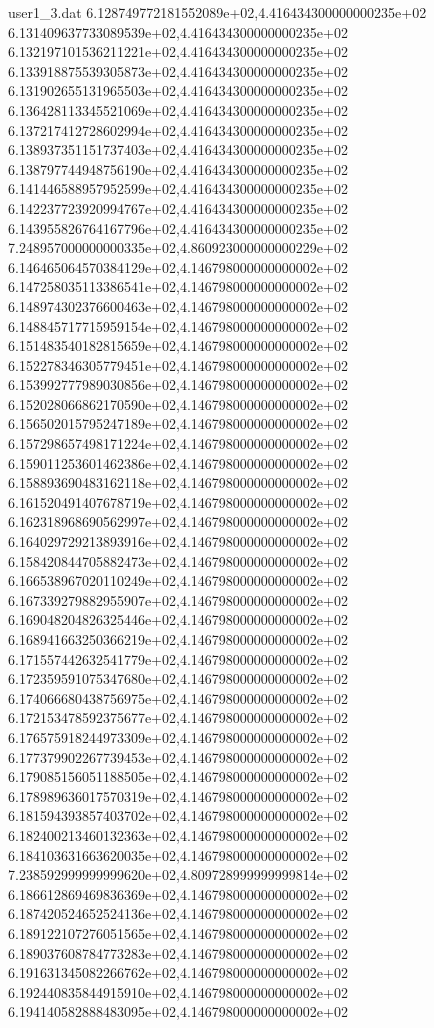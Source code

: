 \begin{filecontents}{user1_3.dat}
6.128749772181552089e+02,4.416434300000000235e+02
6.131409637733089539e+02,4.416434300000000235e+02
6.132197101536211221e+02,4.416434300000000235e+02
6.133918875539305873e+02,4.416434300000000235e+02
6.131902655131965503e+02,4.416434300000000235e+02
6.136428113345521069e+02,4.416434300000000235e+02
6.137217412728602994e+02,4.416434300000000235e+02
6.138937351151737403e+02,4.416434300000000235e+02
6.138797744948756190e+02,4.416434300000000235e+02
6.141446588957952599e+02,4.416434300000000235e+02
6.142237723920994767e+02,4.416434300000000235e+02
6.143955826764167796e+02,4.416434300000000235e+02
7.248957000000000335e+02,4.860923000000000229e+02
6.146465064570384129e+02,4.146798000000000002e+02
6.147258035113386541e+02,4.146798000000000002e+02
6.148974302376600463e+02,4.146798000000000002e+02
6.148845717715959154e+02,4.146798000000000002e+02
6.151483540182815659e+02,4.146798000000000002e+02
6.152278346305779451e+02,4.146798000000000002e+02
6.153992777989030856e+02,4.146798000000000002e+02
6.152028066862170590e+02,4.146798000000000002e+02
6.156502015795247189e+02,4.146798000000000002e+02
6.157298657498171224e+02,4.146798000000000002e+02
6.159011253601462386e+02,4.146798000000000002e+02
6.158893690483162118e+02,4.146798000000000002e+02
6.161520491407678719e+02,4.146798000000000002e+02
6.162318968690562997e+02,4.146798000000000002e+02
6.164029729213893916e+02,4.146798000000000002e+02
6.158420844705882473e+02,4.146798000000000002e+02
6.166538967020110249e+02,4.146798000000000002e+02
6.167339279882955907e+02,4.146798000000000002e+02
6.169048204826325446e+02,4.146798000000000002e+02
6.168941663250366219e+02,4.146798000000000002e+02
6.171557442632541779e+02,4.146798000000000002e+02
6.172359591075347680e+02,4.146798000000000002e+02
6.174066680438756975e+02,4.146798000000000002e+02
6.172153478592375677e+02,4.146798000000000002e+02
6.176575918244973309e+02,4.146798000000000002e+02
6.177379902267739453e+02,4.146798000000000002e+02
6.179085156051188505e+02,4.146798000000000002e+02
6.178989636017570319e+02,4.146798000000000002e+02
6.181594393857403702e+02,4.146798000000000002e+02
6.182400213460132363e+02,4.146798000000000002e+02
6.184103631663620035e+02,4.146798000000000002e+02
7.238592999999999620e+02,4.809728999999999814e+02
6.186612869469836369e+02,4.146798000000000002e+02
6.187420524652524136e+02,4.146798000000000002e+02
6.189122107276051565e+02,4.146798000000000002e+02
6.189037608784773283e+02,4.146798000000000002e+02
6.191631345082266762e+02,4.146798000000000002e+02
6.192440835844915910e+02,4.146798000000000002e+02
6.194140582888483095e+02,4.146798000000000002e+02

\end{filecontents}
